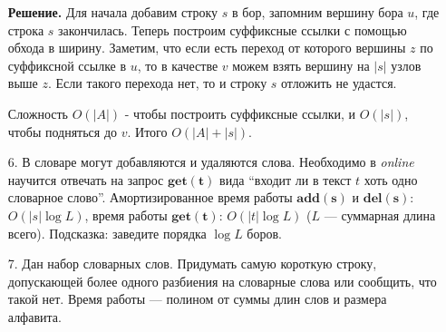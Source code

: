 \begin{enumerate}
	\textbf{Решение.}
	Для начала добавим строку $s$ в бор, запомним вершину бора $u$, где строка $s$ закончилась. Теперь построим 
	суффиксные ссылки с помощью обхода в ширину. Заметим, что если есть переход от которого вершины $z$ по 
	суффиксной ссылке в $u$, то в качестве $v$ можем взять вершину на $|s|$ узлов выше $z$. Если такого перехода 
	нет, то и строку $s$ отложить не удастся. 
	
	Сложность $O(|A|)$ - чтобы построить суффиксные ссылки, и $O(|s|)$, чтобы подняться до $v$. Итого $O(|A| + 
	|s|)$.
	
	\item[6.] В словаре могут добавляются и удаляются слова. Необходимо в \textit{online} научится отвечать на запрос 
	$\mathbf{get(t)}$ вида “входит ли в текст $t$ хоть одно словарное слово”. Амортизированное время работы 
	$\mathbf{add(s)}$ и $\mathbf{del(s)}$: $O(|s| \log L)$, время работы $\mathbf{get(t)}$: $O(|t| \log L)$ ($L$ — 
	суммарная длина всего). Подсказка: заведите порядка $\log L$ боров.
	
	\item[7.] Дан набор словарных слов. Придумать самую короткую строку, допускающей более одного разбиения на 
	словарные слова или сообщить, что такой нет. Время работы — полином от суммы длин слов и размера алфавита.
\end{enumerate}

